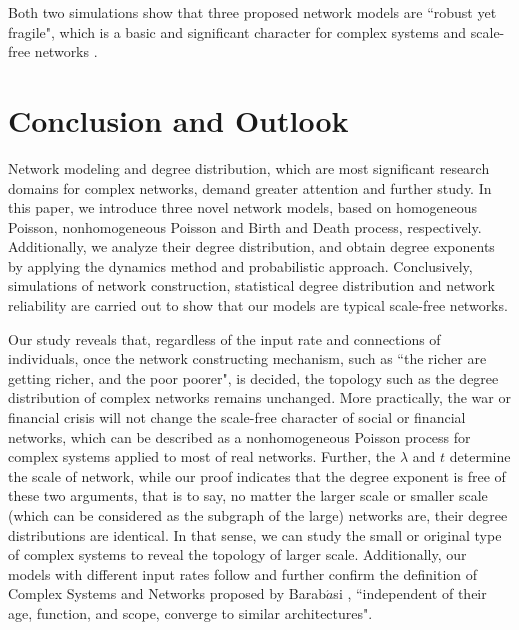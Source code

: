 \documentclass[final]{IEEEtran}
\begin{document}


Both two simulations show that three proposed network models are
``robust yet fragile", which is a basic and significant character
for complex systems and scale-free networks \cite{al} \cite{j1}.

\section{Conclusion and Outlook}
Network modeling and degree distribution, which are most
significant research domains for complex networks, demand greater
attention and further study. In this paper, we introduce three
novel network models, based on homogeneous Poisson, nonhomogeneous
Poisson and Birth and Death process, respectively. Additionally,
we analyze their degree distribution, and obtain degree exponents
by applying the dynamics method and probabilistic approach.
Conclusively, simulations of network construction, statistical
degree distribution and network reliability are carried out to
show that our models are typical scale-free networks.

Our study reveals that, regardless of the input rate and
connections of individuals, once the network constructing
mechanism, such as ``the richer are getting richer, and the poor
poorer", is decided, the topology such as the degree distribution
of complex networks remains unchanged. More practically, the war
or financial crisis will not change the scale-free character of
social or financial networks, which can be described as a
nonhomogeneous Poisson process for complex systems applied to most
of real networks. Further, the $\lambda$ and $t$ determine the
scale of network, while our proof indicates that the degree
exponent is free of these two arguments, that is to say, no matter
the larger scale or smaller scale (which can be considered as the
subgraph of the large) networks are, their degree distributions
are identical. In that sense, we can study the small or original
type of complex systems to reveal the topology of larger scale.
Additionally, our models with different input rates follow and
further confirm the definition of Complex Systems and Networks
proposed by Barab$\acute{a}$si \cite{bx}, ``independent of their
age, function, and scope, converge to similar architectures".
\end{document}
